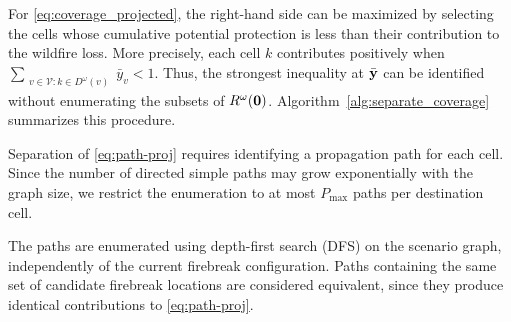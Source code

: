 \documentclass{itor}
\begin{document}
For \eqref{eq:coverage_projected}, the right-hand side can be
maximized by selecting the cells whose cumulative potential
protection is less than their contribution to the wildfire loss.
More precisely, each cell $k$ contributes positively when
$\sum_{\substack{v\in\mathcal V: k\in D^\omega(v)}}\bar y_v<1$. Thus, the strongest inequality at $\bar{\vb{y}}$ can be
identified without enumerating the subsets of
$R^\omega(\vb{0})$. Algorithm~\ref{alg:separate_coverage}
summarizes this procedure.

Separation of \eqref{eq:path-proj} requires identifying a
propagation path for each cell. Since the number of directed
simple paths may grow exponentially with the graph size,
we restrict the enumeration to at most $P_{\max}$ paths per
destination cell.

The paths are enumerated using depth-first search (DFS)
on the scenario graph, independently of the current
firebreak configuration. Paths containing the same set
of candidate firebreak locations are considered equivalent,
since they produce identical contributions to
\eqref{eq:path-proj}.
\end{document}
